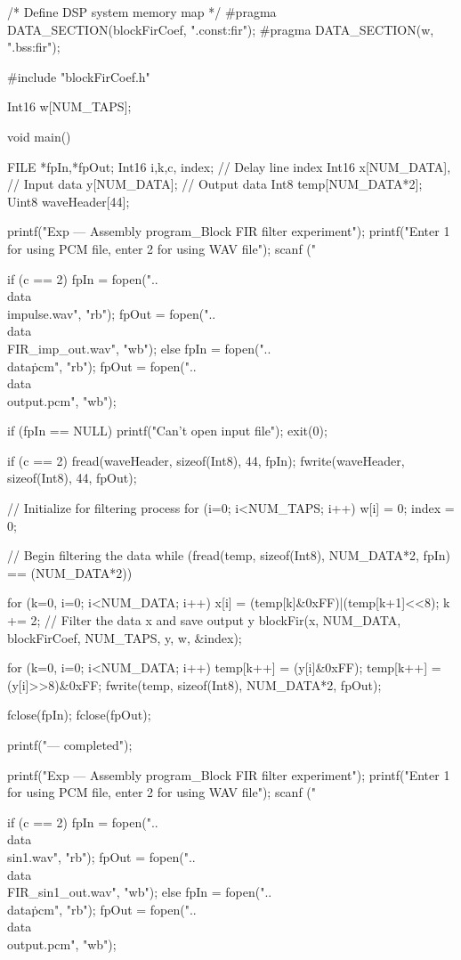 \documentclass{bannerReport}
\begin{document}
\begin{code}
/* Define DSP system memory map */
#pragma DATA_SECTION(blockFirCoef, ".const:fir");
#pragma DATA_SECTION(w, ".bss:fir");

#include "blockFirCoef.h"


Int16 w[NUM_TAPS];

void main()
{
	FILE  *fpIn,*fpOut;
	Int16 i,k,c,
			index;        // Delay line index
	Int16 x[NUM_DATA],  // Input data
			y[NUM_DATA];  // Output data
	Int8  temp[NUM_DATA*2];
	Uint8 waveHeader[44];

	printf("Exp --- Assembly program_Block FIR filter experiment\n");
	printf("Enter 1 for using PCM file, enter 2 for using WAV file\n");
	scanf ("%

	if (c == 2)
	{
		fpIn = fopen("..\\data\\impulse.wav", "rb");
		fpOut = fopen("..\\data\\FIR_imp_out.wav", "wb");
	}
	else
	{
		fpIn = fopen("..\\data\.pcm", "rb");
		fpOut = fopen("..\\data\\output.pcm", "wb");
	}

	if (fpIn == NULL)
	{
		printf("Can't open input file\n");
		exit(0);
	}

	if (c == 2)
	{
		fread(waveHeader, sizeof(Int8), 44, fpIn);
		fwrite(waveHeader, sizeof(Int8), 44, fpOut);
	}

	// Initialize for filtering process
	for (i=0; i<NUM_TAPS; i++)
	{
		w[i] = 0;
	}
	index = 0;


	// Begin filtering the data
	while (fread(temp, sizeof(Int8), NUM_DATA*2, fpIn) == (NUM_DATA*2))
	{
		for (k=0, i=0; i<NUM_DATA; i++)
		{
			x[i] = (temp[k]&0xFF)|(temp[k+1]<<8);
			k += 2;
		}
		// Filter the data x and save output y
		blockFir(x, NUM_DATA, blockFirCoef, NUM_TAPS, y, w, &index);

		for (k=0, i=0; i<NUM_DATA; i++)
		{
			temp[k++] = (y[i]&0xFF);
			temp[k++] = (y[i]>>8)&0xFF;
		}
		fwrite(temp, sizeof(Int8), NUM_DATA*2, fpOut);
	}

	fclose(fpIn);
	fclose(fpOut);

	printf("\nExp --- completed\n");

	printf("Exp --- Assembly program_Block FIR filter experiment\n");
	printf("Enter 1 for using PCM file, enter 2 for using WAV file\n");
	scanf ("%

	if (c == 2)
	{
		fpIn = fopen("..\\data\\sin1.wav", "rb");
		fpOut = fopen("..\\data\\FIR_sin1_out.wav", "wb");
	}
	else
	{
		fpIn = fopen("..\\data\.pcm", "rb");
		fpOut = fopen("..\\data\\output.pcm", "wb");
	}

}
\end{code}
\end{document}
